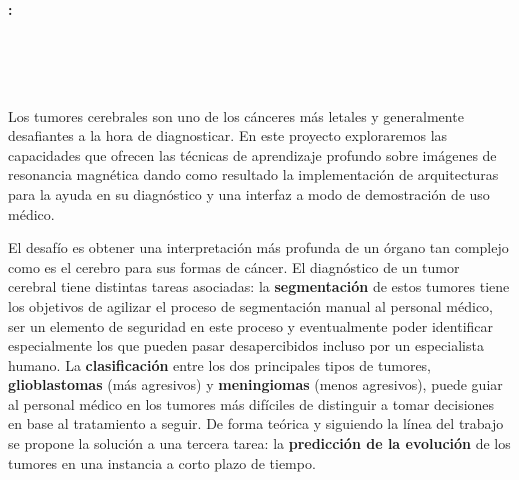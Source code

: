 \chapter*{}

\cleardoublepage
\thispagestyle{empty}


\begin{center}
	\large\bfseries \myTitle: \mySubTitle \\
\end{center}
\begin{center}
	\myName\\
\end{center}

\\

\vspace{0.7cm}
\\

Los tumores cerebrales son uno de los cánceres más letales y generalmente desafiantes a la hora de diagnosticar. En este proyecto exploraremos las capacidades que ofrecen las técnicas de aprendizaje profundo sobre imágenes de resonancia magnética dando como resultado la implementación de arquitecturas para la ayuda en su diagnóstico y una interfaz a modo de demostración de uso médico.

El desafío es obtener una interpretación más profunda de un órgano tan complejo como es el cerebro para sus formas de cáncer. El diagnóstico de un tumor cerebral tiene distintas tareas asociadas: la \textbf{segmentación} de estos tumores tiene los objetivos de agilizar el proceso de segmentación manual al personal médico, ser un elemento de seguridad en este proceso y eventualmente poder identificar especialmente los que pueden pasar desapercibidos incluso por un especialista humano. La \textbf{clasificación} entre los dos principales tipos de tumores, \textbf{glioblastomas} (más agresivos) y \textbf{meningiomas} (menos agresivos), puede guiar al personal médico en los tumores más difíciles de distinguir a tomar decisiones en base al tratamiento a seguir. De forma teórica y siguiendo la línea del trabajo se propone la solución a una tercera tarea: la \textbf{predicción de la evolución} de los tumores en una instancia a corto plazo de tiempo. 

